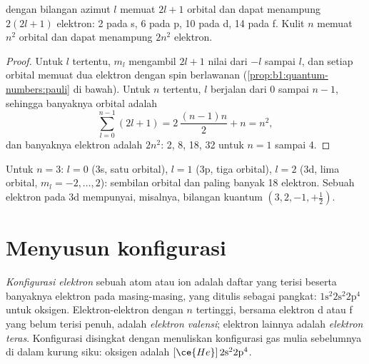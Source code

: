 \begin{proposition}\label{prop:b1:quantum-numbers:capacity}
 dengan bilangan azimut $l$ memuat $2l + 1$ orbital dan dapat
menampung $2(2l + 1)$ elektron: 2 pada s, 6 pada p, 10 pada d, 14 pada f.
Kulit $n$ memuat $n^2$ orbital dan dapat menampung $2n^2$ elektron.
\end{proposition}

\begin{proof}
Untuk $l$ tertentu, $m_l$ mengambil $2l + 1$ nilai dari $-l$ sampai $l$,
dan setiap orbital memuat dua elektron dengan spin berlawanan
(\cref{prop:b1:quantum-numbers:pauli} di bawah). Untuk $n$ tertentu, $l$
berjalan dari $0$ sampai $n - 1$, sehingga banyaknya orbital adalah
\[
  \sum_{l=0}^{n-1} (2l+1) = 2\,\frac{(n-1)n}{2} + n = n^2 ,
\]
dan banyaknya elektron adalah $2n^2$: 2, 8, 18, 32 untuk $n = 1$ sampai 4.
\end{proof}

\begin{example}\label{ex:b1:quantum-numbers:third}
Untuk $n = 3$: $l = 0$ (3s, satu orbital), $l = 1$ (3p, tiga orbital),
$l = 2$ (3d, lima orbital, $m_l = -2, \dots, 2$): sembilan orbital dan
paling banyak 18 elektron. Sebuah elektron pada 3d mempunyai, misalnya,
bilangan kuantum $(3, 2, -1, +\tfrac12)$.
\end{example}

\section{Menyusun konfigurasi}

\begin{definition}\label{def:b1:quantum-numbers:configuration}
\emph{Konfigurasi elektron} sebuah atom atau
ion adalah daftar  yang terisi beserta banyaknya elektron pada
masing-masing, yang ditulis sebagai pangkat: $1\text{s}^2 2\text{s}^2
2\text{p}^4$ untuk oksigen. Elektron-elektron dengan $n$ tertinggi,
bersama elektron  d atau f yang belum terisi penuh, adalah
\emph{elektron valensi}; elektron lainnya adalah
\emph{elektron teras}. Konfigurasi disingkat dengan
menuliskan konfigurasi gas mulia sebelumnya di dalam kurung siku:
oksigen adalah $[\ce{He}]\,2\text{s}^2 2\text{p}^4$.
\end{definition}

